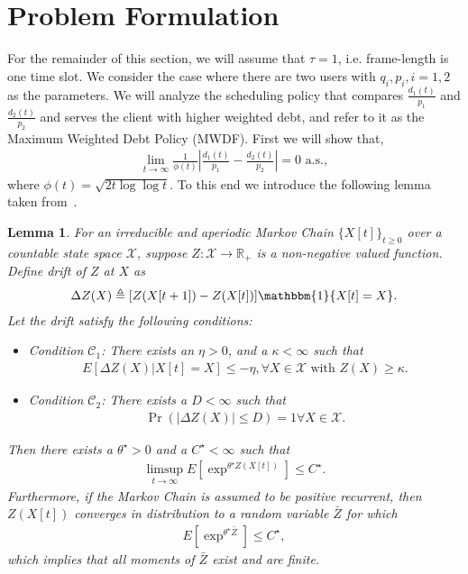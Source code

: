 \documentclass[letterpaper, 10 pt, conference]{ieeeconf}
\newtheorem{lemma}{Lemma}
\begin{document}
\section{Problem Formulation}\label{sec2}
For the remainder of this section, we will assume that $\tau = 1$, i.e. frame-length is one time slot. We consider the case where there are two users with $q_{i}, p_{i}, i = 1,2$ as the parameters. We will analyze the scheduling policy that compares $\frac{d_{1}(t)}{p_{1}}$ and $\frac{d_{2}(t)}{p_{2}}$ and serves the client with higher weighted debt, and refer to it as the Maximum Weighted Debt Policy (MWDF). 
First we will show that, 
\begin{align}\label{eq:pf2}
\lim_{t\to\infty}  \frac{1}{\phi(t)}\left|\frac{d_{1}(t)}{p_{1}}-\frac{d_{2}(t)}{p_{2}}\right| = 0\mbox{ a.s.},
\end{align}
where $\phi(t) = \sqrt{2t\log\log t}  $.
To this end we introduce the following lemma taken from~\cite{c2}.
\begin{lemma}\label{lemma1}
For an irreducible and aperiodic Markov Chain $\{X[t]\}_{t\geq 0}$ over a countable state space $\mathcal{X}$, suppose $Z:\mathcal{X} \to \mathbb{R}_{+} $ is a non-negative valued function. Define drift of $Z$ at $X$ as
\begin{align}
\Delta Z(X) \triangleq [	Z(X[t+1])	- Z(X[t])	] \mathbbm{1}\{ X[t] = X\}.
\end{align}
Let the drift satisfy the following conditions:
\begin{itemize}
\item Condition $\mathcal{C}_{1}$: There exists an $\eta > 0$, and a $\kappa <\infty$ such that 
\begin{align*}
E\left[\Delta Z(X) | X[t] = X\right] \leq -\eta, \forall X\in \mathcal{X} \mbox{ with } Z(X) \geq \kappa.
\end{align*}
\item Condition $\mathcal{C}_{2}$: There exists a $D<\infty$ such that 
\begin{align*}
\Pr(|\Delta Z(X)|\leq D)=1  \forall X\in \mathcal{X}.
\end{align*}
\end{itemize}
Then there exists a $\theta^{\star}>0$ and a $C^{\star}<\infty$ such that 
\begin{align*}
\limsup_{t\to\infty} E[\exp^{\theta^{\star}Z(X[t])}  ] \leq C^{\star}. 
\end{align*}
Furthermore, if the Markov Chain is assumed to be positive recurrent, then $Z(X[t])$ converges in distribution to a random variable $\bar{Z}$ for which 
\begin{align*}
E[\exp^{\theta^{\star}\bar{Z}} ] \leq C^{\star},
\end{align*}
which implies that all moments of $\bar{Z}$ exist and are finite.
 \end{lemma}
\end{document}
